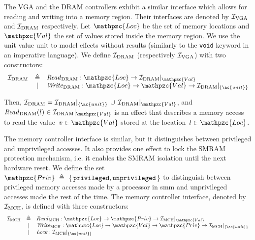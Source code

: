 \begin{example}
  The VGA and the DRAM controllers exhibit a similar interface which allows for
  reading and writing into a memory region.
  Their interfaces are denoted by $\mathcal{I}_{\mathrm{VGA}}$ and $\mathcal{I}_{\mathrm{DRAM}}$
  respectively.
  Let $\mathpzc{Loc}$ be the set of memory locations and $\mathpzc{Val}$ the set
  of values stored inside the memory region.
  We use the unit value \ac{unit} to model effects without results (similarly to
  the \texttt{void} keyword in an imperative language).
  We define $\mathcal{I}_{\mathrm{DRAM}}$ (respectively $\mathcal{I}_{\mathrm{VGA}}$) with two
  constructors:
  \[
    \begin{array}{rcl}
      \I_{\mathrm{DRAM}}
      & \triangleq
      & \func{Read}_{\mathrm{DRAM}} : \mathpzc{Loc} \rightarrow
        \Interface{\I_{\mathrm{DRAM}}}{\mathpzc{Val}} \\

      & |
      & \func{Write}_{\mathrm{DRAM}} : \mathpzc{Loc} \rightarrow \mathpzc{Val}
        \rightarrow \Interface{\I_{\mathrm{DRAM}}}{\{\ac{unit}\}}
    \end{array}
  \]

  Then,
  $\I_{\mathrm{DRAM}} =
  \Interface{\I_{\mathrm{DRAM}}}{\{\ac{unit}\}}\,\cup\,\Interface{\I_{\mathrm{DRAM}}}{\mathpzc{Val}}$,
  and
  $\func{Read}_{\mathrm{DRAM}}(l) \in
  \Interface{\I_{\mathrm{DRAM}}}{\mathpzc{Val}}$ is an effect that describes a
  memory access to read the value~$v \in \mathpzc{Val}$ stored at the
  location~$l \in \mathpzc{Loc}$.

  The memory controller interface is similar, but it distinguishes between
  privileged and unprivileged accesses.
  It also provides one effect to lock the SMRAM protection mechanism, i.e. it
  enables the SMRAM isolation until the next hardware reset.
  We define the set
  $\mathpzc{Priv}~\triangleq~\{\,\val{privileged}, \val{unprivileged}\,\}$ to
  distinguish between privileged memory accesses made by a processor in \ac{smm}
  and unprivileged accesses made the rest of the time.
  The memory controller interface, denoted by $\mathcal{I}_{\mathrm{MCH}}$, is defined
  with three constructors:
  \[
    \begin{array}{rcl}
      \I_{\mathrm{MCH}}
      & \triangleq
      & \func{Read}_{\mathrm{MCH}} : \mathpzc{Loc} \rightarrow \mathpzc{Priv}
        \rightarrow \Interface{\I_{\mathrm{MCH}}}{\mathpzc{Val}} \\

      & |
      & \func{Write}_{\mathrm{MCH}} : \mathpzc{Loc} \rightarrow \mathpzc{Val}
        \rightarrow \mathpzc{Priv} \rightarrow
        \Interface{\I_{\mathrm{MCH}}}{\{\ac{unit}\}} \\

      & |
      & \func{Lock} : \Interface{\I_{\mathrm{MCH}}}{\{\ac{unit}\}}
    \end{array}
  \]
\end{example}

